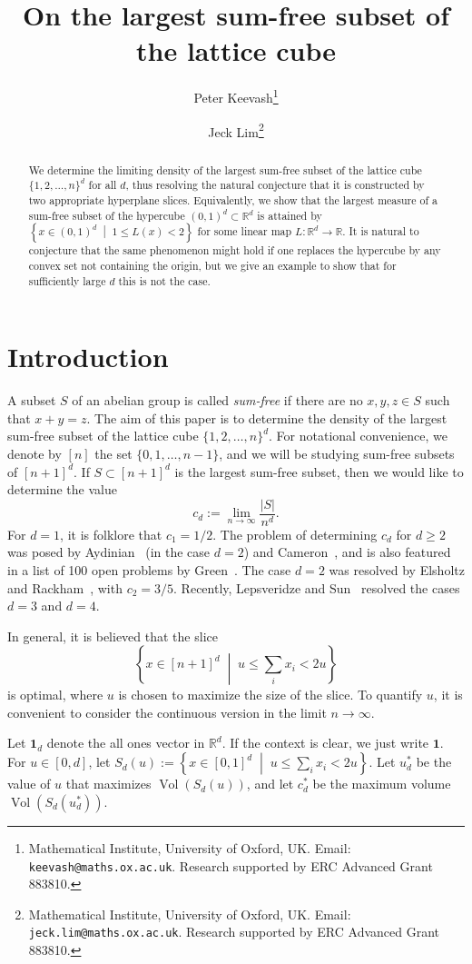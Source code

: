 \documentclass{article}
\title{On the largest sum-free subset of the lattice cube}
\author{Peter Keevash\thanks{Mathematical Institute, University of Oxford, UK. Email: {\tt keevash@maths.ox.ac.uk}. Research supported by ERC Advanced Grant 883810.} \and Jeck Lim\thanks{Mathematical Institute, University of Oxford, UK. Email: {\tt jeck.lim@maths.ox.ac.uk}. Research supported by ERC Advanced Grant 883810.}}
\date{}
\newcommand{\setcond}[2]{\left\{ #1 \;\middle\vert\; #2 \right\}}
\newcommand{\RR}{\mathbb{R}}
\newcommand{\ones}{\mathbf{1}}
\theoremstyle{definition}
\DeclareMathOperator{\Vol}{Vol}
\begin{document}
\maketitle

\begin{abstract}
We determine the limiting density of the largest sum-free subset of the lattice cube $\{1,2,\ldots,n\}^d$ for all $d$, thus resolving the natural conjecture that it is constructed by two appropriate hyperplane slices. Equivalently, we show that the largest measure of a sum-free subset of the hypercube $(0,1)^d\subset \mathbb{R}^d$ is attained by $\setcond{x\in (0,1)^d}{1\leq L(x)<2}$ for some linear map $L:\mathbb{R}^d\to \mathbb{R}$. It is natural to conjecture that the same phenomenon might hold if one replaces the hypercube by any convex set not containing the origin, but we give an example to show that for sufficiently large $d$ this is not the case.
\end{abstract}

\section{Introduction}

A subset $S$ of an abelian group is called \emph{sum-free} if there are no $x,y,z\in S$ such that $x+y=z$. The aim of this paper is to determine the density of the largest sum-free subset of the lattice cube $\{1,2,\ldots,n\}^d$. For notational convenience, we denote by $[n]$ the set $\{0,1,\ldots,n-1\}$, and we will be studying sum-free subsets of $[n+1]^d$. If $S\subset [n+1]^d$ is the largest sum-free subset, then we would like to determine the value
\[c_d := \lim_{n\to\infty} \frac{|S|}{n^d}.\]
For $d=1$, it is folklore that $c_1=1/2$. The problem of determining $c_d$ for $d\geq 2$ was posed by Aydinian~\cite[Problem 10]{C05} (in the case $d=2$) and Cameron~\cite{C02}, and is also featured in a list of 100 open problems by Green~\cite[Problem~6]{G100}. The case $d=2$ was resolved by Elsholtz and Rackham~\cite{ER17}, with $c_2=3/5$. Recently, Lepsveridze and Sun~\cite{LS23} resolved the cases $d=3$ and $d=4$.

In general, it is believed that the slice
\[\setcond{x\in [n+1]^d}{u\leq \sum_i x_i<2u}\]
is optimal, where $u$ is chosen to maximize the size of the slice. To quantify $u$, it is convenient to consider the continuous version in the limit $n\to\infty$.

Let $\ones_d$ denote the all ones vector in $\RR^d$. If the context is clear, we just write $\ones$. For $u\in [0,d]$, let $S_d(u) := \setcond{x\in [0,1]^d}{u \leq \sum_i x_i < 2u}$. Let $u_d^*$ be the value of $u$ that maximizes $\Vol(S_d(u))$, and let $c_d^*$ be the maximum volume $\Vol(S_d(u_d^*))$. 
\end{document}
